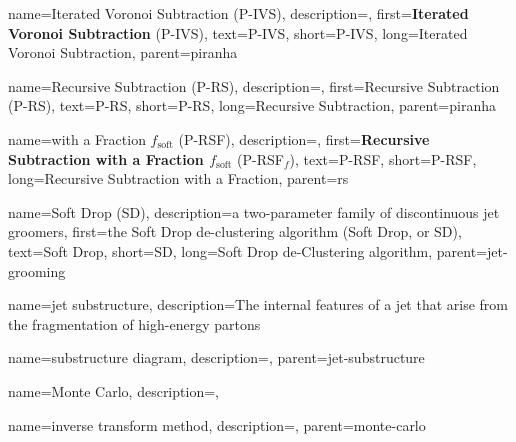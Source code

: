     {
        name=Iterated Voronoi Subtraction (P-IVS),
        description={},
        first={\textbf{Iterated Voronoi Subtraction} (P-IVS)},
        text={P-IVS},
        short={P-IVS},
        long={Iterated Voronoi Subtraction},
        parent=piranha
    }

    {
        name=Recursive Subtraction (P-RS),
        description={},
        first={Recursive Subtraction (P-RS)},
        text={P-RS},
        short={P-RS},
        long={Recursive Subtraction},
        parent=piranha
    }

    {
        name=with a Fraction \(f_\text{soft}\) (P-RSF),
        description={},
        first={\textbf{Recursive Subtraction with a Fraction \(f_\text{soft}\)} (P-RSF\(_f\))},
        text={P-RSF},
        short={P-RSF},
        long={Recursive Subtraction with a Fraction},
        parent=rs
    }


    {
        name=Soft Drop (SD),
        description={a two-parameter family of discontinuous jet groomers},
        first={the Soft Drop de-clustering algorithm (Soft Drop, or SD)},
        text={Soft Drop},
        short={SD},
        long={Soft Drop de-Clustering algorithm},
        parent=jet-grooming
    }



{
  name=jet substructure,
  description={The internal features of a jet that arise from the fragmentation of high-energy partons}
}

    {
      name=substructure diagram,
      description={},
      parent=jet-substructure
    }






{
    name=Monte Carlo,
    description={},
}

    {
        name=inverse transform method,
        description={},
        parent=monte-carlo
    }





